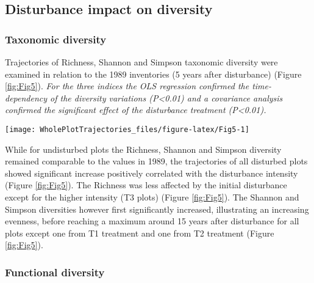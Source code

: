 \documentclass[fleqn,10pt]{ArtEcoFoG} %
\theoremstyle{definition}
\theoremstyle{definition}
\theoremstyle{definition}
\theoremstyle{remark}
\begin{document}
\subsection{Disturbance impact on
diversity}\label{disturbance-impact-on-diversity}

\subsubsection{Taxonomic diversity}\label{taxonomic-diversity}

Trajectories of Richness, Shannon and Simpson taxonomic diversity were
examined in relation to the 1989 inventories (5 years after disturbance)
(Figure \ref{fig:Fig5}). \emph{For the three indices the OLS regression
confirmed the time-dependency of the diversity variations
(P\textless{}0.01) and a covariance analysis confirmed the significant
effect of the disturbance treatment (P\textless{}0.01).}

\begin{figure*}

{\centering \texttt{[image: WholePlotTrajectories\_files/figure-latex/Fig5-1]} 

}

\caption{Trajectories of the difference to reference inventory over 30 years after disturbance of plots communities **(a)** Richness, **(b)** Shannon and **(c)** Simpson diversities. Trajectories correspond to the median (solid line) and 0.025 and 0.975 percentile (gray envelope) observed after 50 iteration of the taxonomic uncertainty propagation. Initial treatments are represented by solid lines colorswith green for control, blue for T1,orange for T2 and red for T3.}\label{fig:Fig5}
\end{figure*}

While for undisturbed plots the Richness, Shannon and Simpson diversity
remained comparable to the values in 1989, the trajectories of all
disturbed plots showed significant increase positively correlated with
the disturbance intensity (Figure \ref{fig:Fig5}). The Richness was less
affected by the initial disturbance except for the higher intensity (T3
plots) (Figure \ref{fig:Fig5}). The Shannon and Simpson diversities
however first significantly increased, illustrating an increasing
evenness, before reaching a maximum around 15 years after disturbance
for all plots except one from T1 treatment and one from T2 treatment
(Figure \ref{fig:Fig5}).

\subsubsection{Functional diversity}\label{functional-diversity}
\end{document}
